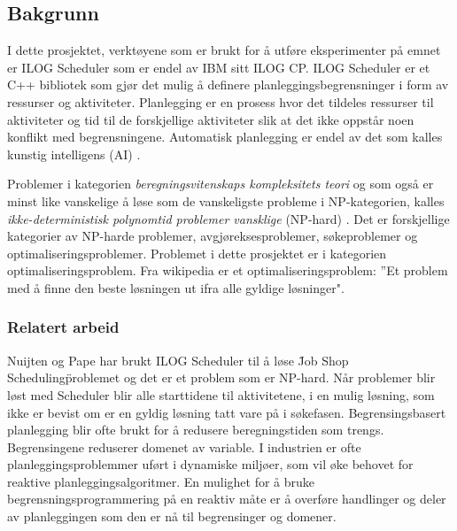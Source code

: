 \subsection{Bakgrunn}
I dette prosjektet, verktøyene som er brukt for å utføre eksperimenter på emnet er ILOG Scheduler som er endel av IBM sitt ILOG CP. ILOG Scheduler er et C++ bibliotek som gjør det mulig å definere planleggingsbegrensninger i form av ressurser og aktiviteter. Planlegging er en prosess hvor det tildeles ressurser til aktiviteter og tid til de forskjellige aktiviteter slik at det ikke oppstår noen konflikt med begrensningene.\cite{Pape94implementationof} Automatisk planlegging er endel av det som kalles kunstig intelligens (AI) .

Problemer i kategorien \textit{beregningsvitenskaps kompleksitets teori}\cite{compcomplextheory} og som også er minst like vanskelige å løse som de vanskeligste probleme i NP-kategorien, kalles \textit{ikke-deterministisk polynomtid problemer vansklige} (NP-hard) . Det er forskjellige kategorier av NP-harde problemer, avgjøreksesproblemer, søkeproblemer og optimaliseringsproblemer. \cite{nphardwikipedia} Problemet i dette prosjektet er i kategorien optimaliseringsproblem. Fra wikipedia \cite{optimizationproblemwiki} er et optimaliseringsproblem: ''Et problem med å finne den beste løsningen ut ifra alle gyldige løsninger".

\subsubsection{Relatert arbeid}
Nuijten og Pape har brukt ILOG Scheduler til å løse \"Job Shop Scheduling\" problemet  og det er et problem som er NP-hard. Når problemer blir løst med Scheduler blir alle starttidene til aktivitetene, i en mulig løsning, som ikke er bevist om er en gyldig løsning tatt vare på i søkefasen. Begrensingsbasert planlegging blir ofte brukt for å redusere beregningstiden som trengs. Begrensingene reduserer domenet av variable. I industrien er ofte planleggingsproblemmer uført i dynamiske miljøer, som vil øke behovet for reaktive planleggingsalgoritmer. En mulighet for å bruke begrensningsprogrammering på en reaktiv måte er å overføre handlinger og deler av planleggingen som den er nå til begrensinger og domener. \cite{Nuijten:1998:CJS:594934.594971}

